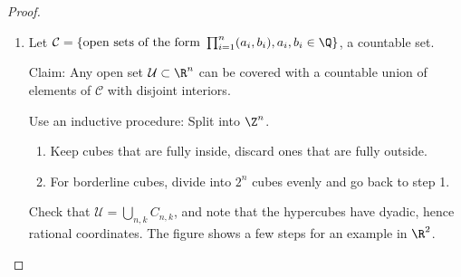 \documentclass{article}
\begin{document}
\begin{proof}
    \leavevmode
    \begin{enumerate}[label=(\arabic*)]
        \item Let $\mathcal{C} = \{\text{open sets of the form } \prod_{i=1}^n (a_i, b_i), a_i, b_i \in \Q\}$, a countable set.

            Claim: Any open set $\mathcal{U} \subset \R^n$ can be covered with a countable union of elements of $\mathcal{C}$ with disjoint interiors.

            Use an inductive procedure: Split into $\Z^n$.
            \begin{enumerate}[label=\arabic*.]
                \item Keep cubes that are fully inside, discard ones that are fully outside.
                \item For borderline cubes, divide into $2^n$ cubes evenly and go back to step 1.
            \end{enumerate}
            Check that $\mathcal{U} = \bigcup_{n, k} C_{n, k}$, and note that the hypercubes have dyadic, hence rational coordinates.
            The figure shows a few steps for an example in $\R^2$.
            \begin{center}
\end{center}
\end{enumerate}
\end{proof}
\end{document}
